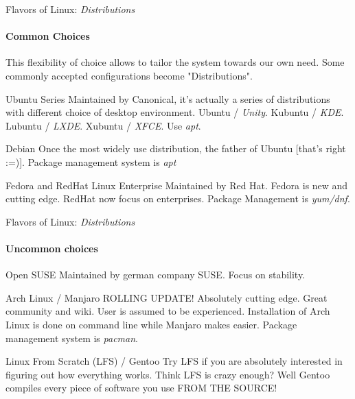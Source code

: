 \begin{frame}{Flavors of Linux: \textit{Distributions}}
\framesubtitle{Common Choices}
\begin{small}
	This flexibility of choice allows to tailor the system towards our own need. Some commonly accepted configurations become "Distributions".
\end{small} 
\begin{block}{Ubuntu Series}
	Maintained by Canonical, it's actually a series of distributions with different choice of desktop environment. Ubuntu / \textit{Unity}. Kubuntu / \textit{KDE}. Lubuntu / \textit{LXDE}. Xubuntu / \textit{XFCE}. Use \textit{apt}.
\end{block}
\begin{block}{Debian}
	Once the most widely use distribution, the father of Ubuntu [that's right :=)]. Package management system is \textit{apt}
\end{block}
\begin{block}{Fedora and RedHat Linux Enterprise}
	Maintained by Red Hat. Fedora is new and cutting edge. RedHat now focus on enterprises. Package Management is \textit{yum/dnf}.
\end{block}
\end{frame}

\begin{frame}{Flavors of Linux: \textit{Distributions}}
\framesubtitle{Uncommon choices}
\begin{block}{Open SUSE}
	Maintained by german company SUSE. Focus on stability. 
\end{block}
\begin{block}{Arch Linux / Manjaro}
	ROLLING UPDATE! Absolutely cutting edge. Great community and wiki. User is assumed to be experienced. Installation of Arch Linux is done on command line while Manjaro makes easier. Package management system is \textit{pacman}.
\end{block}
\begin{block}{Linux From Scratch (LFS) / Gentoo}
	Try LFS if you are absolutely interested in figuring out how everything works. Think LFS is crazy enough? Well Gentoo compiles every piece of software you use FROM THE SOURCE! 
\end{block}
\end{frame}

